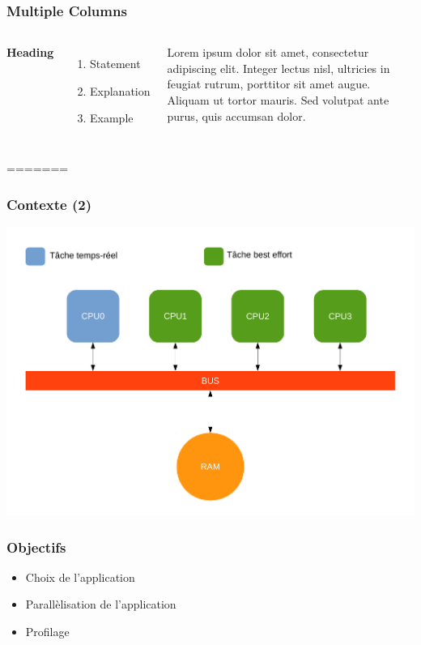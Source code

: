 \begin{frame}
\frametitle{Multiple Columns}
\begin{columns}[c] %

\textbf{Heading}
\begin{enumerate}
\item Statement
\item Explanation
\item Example
\end{enumerate}

Lorem ipsum dolor sit amet, consectetur adipiscing elit. Integer lectus nisl, ultricies in feugiat rutrum, porttitor sit amet augue. Aliquam ut tortor mauris. Sed volutpat ante purus, quis accumsan dolor.

\end{columns}
=======
\begin{frame}
\frametitle{Contexte (2)}
\begin{center}
\includegraphics[scale=0.3]{include/archi.pdf}
\end{center}
\end{frame}

\begin{frame}
\frametitle{Objectifs}
\begin{itemize}
  \item Choix de l'application
  \item Parallèlisation de l'application
  \item Profilage
\end{itemize}
\end{frame}


\end{frame}
